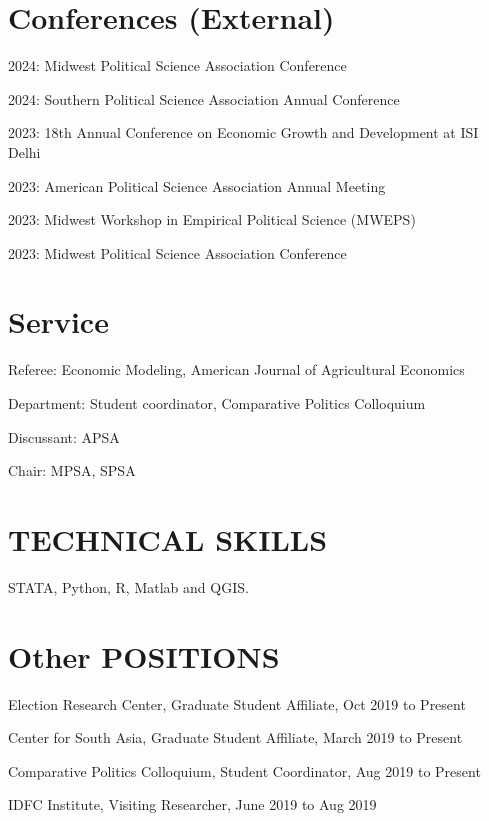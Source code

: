 \documentclass[10pt,letterpaper]{article}
\renewenvironment{itemize}{
  \begin{list}{}{
      \setlength{\leftmargin}{1.5em}
      \setlength{\itemsep}{0.25em}
      \setlength{\parskip}{0pt}
      \setlength{\parsep}{0.25em}
    }
}{
  \end{list}
}
\begin{document}
\section*{Conferences (External)}
 \begin{itemize}
   \item 2024: Midwest Political Science Association Conference 
  \item 2024: Southern Political Science Association Annual Conference  
 \item 2023: 18th Annual Conference on Economic Growth and Development at ISI Delhi
\item 2023: American Political Science Association Annual Meeting  
\item 2023: Midwest Workshop in Empirical Political Science (MWEPS)
\item 2023: Midwest Political Science Association Conference 
\end{itemize}
\section*{Service}
 \begin{itemize}
\item Referee: Economic Modeling, American Journal of Agricultural Economics
\item Department: Student coordinator, Comparative Politics Colloquium
\item Discussant: APSA
\item Chair: MPSA, SPSA
\end{itemize}
\section*{TECHNICAL SKILLS}
STATA, Python, R, Matlab and QGIS.

\section*{Other POSITIONS}
\begin{itemize}
\item Election Research Center, Graduate Student Affiliate, Oct 2019 to Present
\item Center for South Asia, Graduate Student Affiliate, March 2019 to Present
\item Comparative Politics Colloquium, Student Coordinator, Aug 2019 to Present
\item IDFC Institute, Visiting Researcher, June 2019 to Aug 2019
\end{itemize}
\end{document}

